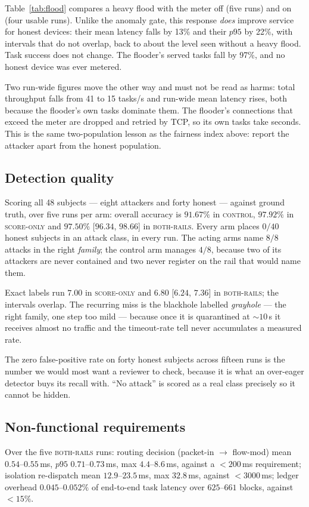 \documentclass[10pt,twocolumn,letterpaper]{article}
\newcommand{\armbase}{\textsc{control}}
\newcommand{\armscore}{\textsc{score-only}}
\newcommand{\armfull}{\textsc{both-rails}}
\begin{document}
Table~\ref{tab:flood} compares a heavy flood with the meter off (five runs) and
on (four usable runs). Unlike the anomaly gate, this response \emph{does} improve service for
honest devices: their mean latency falls by 13\% and their $p95$ by 22\%, with
intervals that do not overlap, back to about the level seen without a heavy
flood. Task success does not change. The flooder's served tasks fall by 97\%,
and no honest device was ever metered.

Two run-wide figures move the other way and must not be read as harms: total
throughput falls from 41 to 15 tasks/s and run-wide mean latency rises, both
because the flooder's own tasks dominate them. The flooder's connections that
exceed the meter are dropped and retried by TCP, so its own tasks take seconds.
This is the same two-population lesson as the fairness index above: report the
attacker apart from the honest population.

\subsection{Detection quality}
\label{sec:res:detect}
Scoring all 48 subjects --- eight attackers and forty honest --- against ground
truth, over five runs per arm: overall accuracy is $91.67\%$ in \armbase{},
$97.92\%$ in \armscore{} and $97.50\%$ [$96.34$, $98.66$] in \armfull{}. Every
arm places $0/40$ honest subjects in an attack class, in every run. The acting
arms name $8/8$ attacks in the right \emph{family}; the control arm manages
$4/8$, because two of its attackers are never contained and two never register
on the rail that would name them.

Exact labels run $7.00$ in \armscore{} and $6.80$ [$6.24$, $7.36$] in
\armfull{}; the intervals overlap. The recurring miss is the blackhole labelled
\emph{grayhole} --- the right family, one step too mild --- because once it is
quarantined at ${\sim}10$\,s it receives almost no traffic and the timeout-rate
tell never accumulates a measured rate.

The zero false-positive rate on forty honest subjects across fifteen runs is
the number we would most want a reviewer to check, because it is what an
over-eager detector buys its recall with. ``No attack'' is scored as a real
class precisely so it cannot be hidden.

\subsection{Non-functional requirements}
\label{sec:res:nfr}
Over the five \armfull{} runs: routing decision (packet-in $\to$ flow-mod) mean
$0.54$--$0.55$\,ms, $p95$ $0.71$--$0.73$\,ms, max $4.4$--$8.6$\,ms, against a
$<200$\,ms requirement; isolation re-dispatch mean $12.9$--$23.5$\,ms, max
$32.8$\,ms, against $<3000$\,ms; ledger overhead $0.045$--$0.052\%$ of
end-to-end task latency over $625$--$661$ blocks, against $<15\%$.
\end{document}

